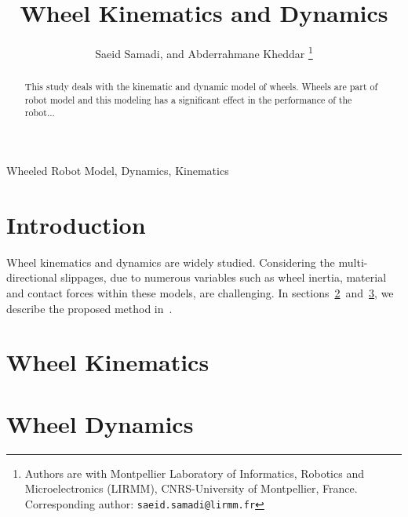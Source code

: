 \documentclass[letterpaper, 10pt, conference]{ieeeconf}
\title{\Large \bf
	Wheel Kinematics and Dynamics}
\author{Saeid Samadi, and Abderrahmane Kheddar
	\thanks{Authors are with Montpellier Laboratory of Informatics,
		Robotics and Microelectronics (LIRMM), CNRS-University of Montpellier, France.
		Corresponding author: {\tt\footnotesize saeid.samadi@lirmm.fr}}
}
\begin{document}
\maketitle
\thispagestyle{empty}
\pagestyle{empty}

\begin{abstract}
	This study deals with the kinematic and dynamic model of wheels. Wheels are part of robot model and this modeling has a significant effect in the performance of the robot...
\end{abstract}

\begin{keywords}
	Wheeled Robot Model, Dynamics, Kinematics
\end{keywords}

	
\begin{comment}

\begin{table}[h]
\renewcommand{\arraystretch}{1.5}
\caption{Table of Symbols}
\label{table_example}
\centering
\begin{tabular}{p{0.09\textwidth}|p{0.09\textwidth}||p{0.09\textwidth}|p{0.09\textwidth}}
\hline
\bfseries \centering First & \bfseries Next & me & you \\
\hline\hline
1.0 & 2.0\\
\hline
\end{tabular}
\end{table}
\end{comment}

\section{Introduction} \label{Sec_Introduction}
Wheel kinematics and dynamics are widely studied. Considering the multi-directional slippages, due to numerous variables such as wheel inertia, material and contact forces within these models, are challenging.  In sections~\ref{Sec_Kinematics}~and~\ref{Sec_Dynamics}, we describe the proposed method in~\cite{Seegmiller2014thesis}.
\section{Wheel Kinematics} \label{Sec_Kinematics}

\section{Wheel Dynamics} \label{Sec_Dynamics}



\end{document}
